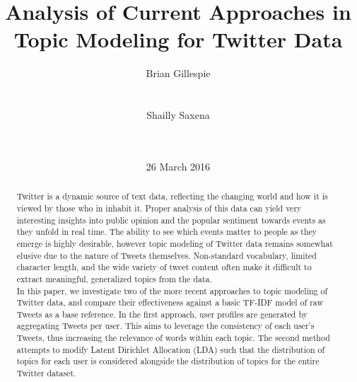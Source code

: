 \documentclass{acm_proc_article-sp}
\begin{document}
\title{Analysis of Current Approaches in Topic Modeling for Twitter Data}

\author{
\alignauthor
Brian Gillespie\\
       \\
       \\
\alignauthor
Shailly Saxena\\
       \\
       \\
}

\date{26 March 2016}


\maketitle
\begin{abstract}
\hspace*{5mm}Twitter is a dynamic source of text data, reflecting the changing world and how it is viewed by those who in inhabit it. Proper analysis of this data can yield very interesting insights into public opinion and the popular sentiment towards events as they unfold in real time. The ability to see which events matter to people as they emerge is highly desirable, however topic modeling of Twitter data remains somewhat elusive due to the nature of Tweets themselves. Non-standard vocabulary, limited character length, and the wide variety of tweet content often make it difficult to extract meaningful, generalized topics from the data. \\
\hspace*{5mm}In this paper, we investigate two of the more recent approaches to topic modeling of Twitter data, and compare their effectiveness against a basic TF-IDF model of raw Tweets as a base reference. In the first approach, user profiles are generated by aggregating Tweets per user. This aims to leverage the consistency of each user's Tweets, thus increasing the relevance of words within each topic. The second method attempts to modify Latent Dirichlet Allocation (LDA) such that the distribution of topics for each user is considered alongside the distribution of topics for the entire Twitter dataset.  
\end{abstract}

\end{document}

